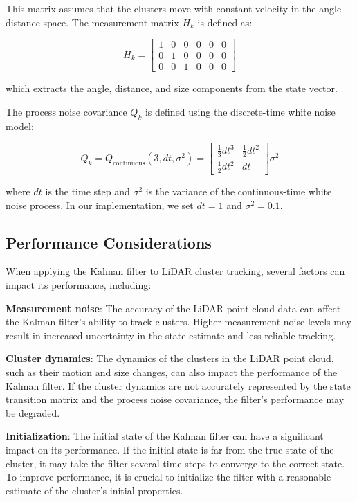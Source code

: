 \documentclass[journal]{IEEEtran} %
\begin{document}
This matrix assumes that the clusters move with constant velocity in the angle-distance space. The measurement matrix $H_k$ is defined as:

\[
H_k = \begin{bmatrix}
1 & 0 & 0 & 0 & 0 & 0 \\
0 & 1 & 0 & 0 & 0 & 0 \\
0 & 0 & 1 & 0 & 0 & 0
\end{bmatrix}
\]

which extracts the angle, distance, and size components from the state vector.

The process noise covariance $Q_k$ is defined using the discrete-time white noise model:

\[
Q_k = Q_{\text{continuous}}(3, dt, \sigma^2) =
\begin{bmatrix}
\frac{1}{3}dt^3 & \frac{1}{2}dt^2 \\
\frac{1}{2}dt^2 & dt
\end{bmatrix} \sigma^2
\]

where $dt$ is the time step and $\sigma^2$ is the variance of the continuous-time white noise process. In our implementation, we set $dt = 1$ and $\sigma^2 = 0.1$.

\subsection{Performance Considerations}

When applying the Kalman filter to LiDAR cluster tracking, several factors can impact its performance, including:

\textbf{Measurement noise}: The accuracy of the LiDAR point cloud data can affect the Kalman filter's ability to track clusters. Higher measurement noise levels may result in increased uncertainty in the state estimate and less reliable tracking.

\textbf{Cluster dynamics}: The dynamics of the clusters in the LiDAR point cloud, such as their motion and size changes, can also impact the performance of the Kalman filter. If the cluster dynamics are not accurately represented by the state transition matrix and the process noise covariance, the filter's performance may be degraded.

\textbf{Initialization}: The initial state of the Kalman filter can have a significant impact on its performance. If the initial state is far from the true state of the cluster, it may take the filter several time steps to converge to the correct state. To improve performance, it is crucial to initialize the filter with a reasonable estimate of the cluster's initial properties.
\end{document}
